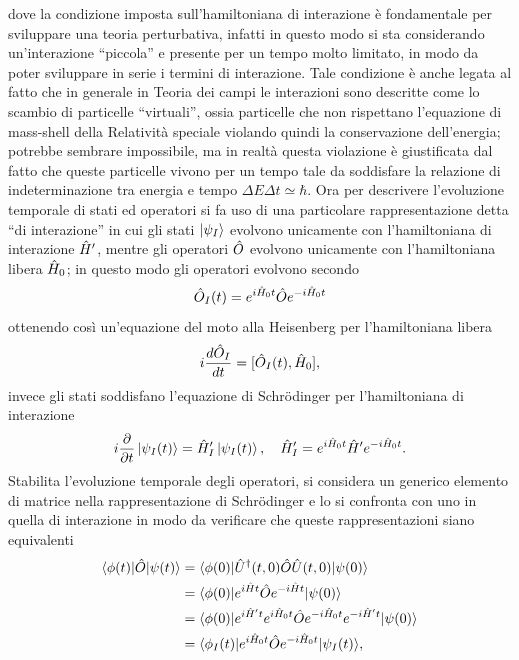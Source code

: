 dove la condizione imposta sull'hamiltoniana di interazione è fondamentale per sviluppare una teoria perturbativa, infatti in questo modo si sta considerando un'interazione ``piccola'' e presente per un tempo molto limitato, in modo da poter sviluppare in serie i termini di interazione. Tale condizione è anche legata al fatto che in generale in Teoria dei campi le interazioni sono descritte come lo scambio di particelle ``virtuali'', ossia particelle che non rispettano l'equazione di mass-shell della Relatività speciale violando quindi la conservazione dell'energia; potrebbe sembrare impossibile, ma in realtà questa violazione è giustificata dal fatto che queste particelle vivono per un tempo tale da soddisfare la relazione di indeterminazione tra energia e tempo $\Delta E \Delta t  \simeq \hbar$. Ora per descrivere l'evoluzione temporale di stati ed operatori si fa uso di una particolare rappresentazione detta ``di interazione'' in cui gli stati $\ket{\psi_I}$ evolvono unicamente con l'hamiltoniana di interazione $\hat{H}'$, mentre gli operatori $\hat{O}$ evolvono unicamente con l'hamiltoniana libera $\hat{H}_0$; in questo modo gli operatori evolvono secondo
\begin{equation}
    \hat{O}_I(t) = e^{i\hat{H}_0t}\hat{O} e^{-i\hat{H}_0t}
\end{equation}
ottenendo così un'equazione del moto alla Heisenberg per l'hamiltoniana libera
\begin{equation}
    i\frac{d\hat{O}_I}{dt} = [\hat{O}_I(t),\hat{H}_0],
\end{equation}
invece gli stati soddisfano l'equazione di Schr\"odinger per l'hamiltoniana di interazione
\begin{equation}
    i\frac{\partial}{\partial t}\ket{\psi_I(t)} = \hat{H}'_I\ket{\psi_I(t)},\quad \hat{H}_I' = e^{i\hat{H}_0t}\hat{H}' e^{-i\hat{H}_0t}.
\end{equation}
Stabilita l'evoluzione temporale degli operatori, si considera un generico elemento di matrice nella rappresentazione di Schr\"odinger e lo si confronta con uno in quella di interazione in modo da verificare che queste rappresentazioni siano equivalenti
\begin{equation}
    \begin{split}
        \langle \phi(t) | \hat{O} | \psi(t) \rangle&=\langle \phi(0) | \hat{U}^\dagger(t,0)\hat{O}\hat{U}(t,0) | \psi(0) \rangle \\
        &=\langle \phi(0) | e^{i\hat{H} t}\hat{O} e^{-i\hat{H} t} | \psi(0) \rangle \\
        &=\langle \phi(0) | e^{i\hat{H}' t}e^{i\hat{H}_0 t}\hat{O} e^{-i\hat{H}_0 t}e^{-i\hat{H}' t} | \psi(0) \rangle \\
        &=\langle \phi_I(t) | e^{i\hat{H}_0 t}\hat{O} e^{-i\hat{H}_0 t} | \psi_I(t) \rangle,
    \end{split}
\end{equation}
